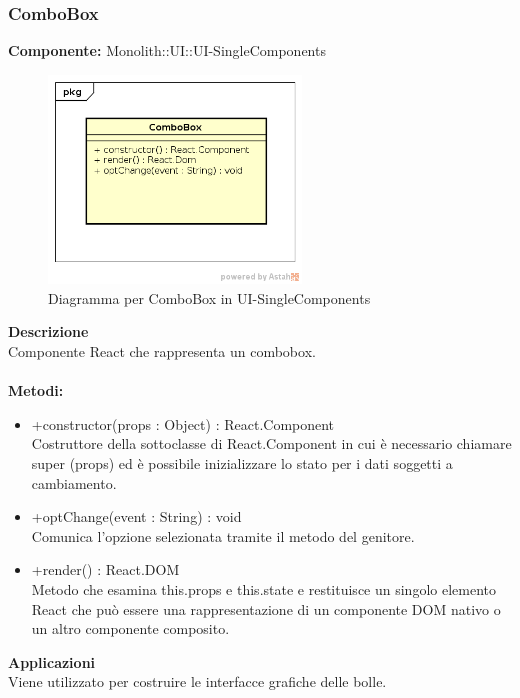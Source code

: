 \subsubsection{ComboBox}
\textbf{Componente:}  Monolith::UI::UI-SingleComponents\\
   \FloatBarrier
   \begin{figure}[ht]
   \centering
   \includegraphics[width=0.6\textwidth]{img/single-ComboBox}
   \caption{{Diagramma per ComboBox in UI-SingleComponents}}
\end{figure}
\FloatBarrier
\textbf{Descrizione}\\
Componente React che rappresenta un combobox. \\\\
\textbf{Metodi:} \begin{itemize}\item +constructor(props : Object) : React.Component \\Costruttore della sottoclasse di React.Component in cui è necessario chiamare super (props) ed è possibile inizializzare lo stato per i dati soggetti a cambiamento.\item +optChange(event : String) : void  \\Comunica l’opzione selezionata tramite il metodo del genitore. \item +render() : React.DOM \\Metodo che esamina this.props e this.state e restituisce un singolo elemento React che può essere una rappresentazione di un componente DOM nativo o un altro componente composito.\end{itemize} 


\textbf{Applicazioni}\\
Viene utilizzato per costruire le interfacce grafiche delle bolle. 


\clearpage

